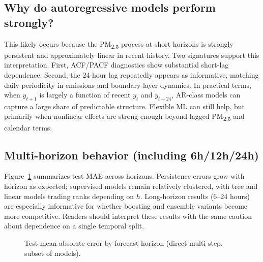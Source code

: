 \documentclass[11pt,a4paper]{article}
\begin{document}


\subsection{Why do autoregressive models perform strongly?}

This likely occurs because the PM\textsubscript{2.5} process at short horizons is strongly persistent and approximately linear in recent history. Two signatures support this interpretation. First, ACF/PACF diagnostics show substantial short-lag dependence. Second, the 24-hour lag repeatedly appears as informative, matching daily periodicity in emissions and boundary-layer dynamics. In practical terms, when $y_{t+1}$ is largely a function of recent $y_t$ and $y_{t-24}$, AR-class models can capture a large share of predictable structure. Flexible ML can still help, but primarily when nonlinear effects are strong enough beyond lagged PM\textsubscript{2.5} and calendar terms.

\subsection{Multi-horizon behavior (including 6h/12h/24h)}

Figure~\ref{fig:mae_horizon} summarizes test MAE across horizons. Persistence errors grow with horizon as expected; supervised models remain relatively clustered, with tree and linear models trading ranks depending on $h$. Long-horizon results ($6$--$24$ hours) are especially informative for whether boosting and ensemble variants become more competitive. Readers should interpret these results with the same caution about dependence on a single temporal split.

\begin{figure}[t]
\centering
\caption{Test mean absolute error by forecast horizon (direct multi-step, subset of models).}
\label{fig:mae_horizon}
\end{figure}
\end{document}
